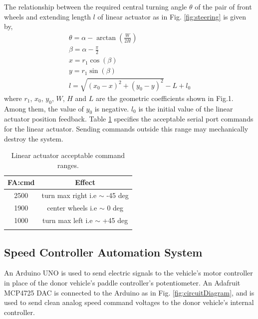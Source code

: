 \documentclass[a4paper]{article}
\begin{document}
	The relationship between the required central turning angle $\theta$ of the pair of front wheels and extending length $l$ of linear actuator as in Fig. \ref{fig:steering} is given by,    
	\begin{gather}
	\theta = \alpha - \arctan(\frac{W}{2H}) \\
	\beta = \alpha -\frac{\pi}{2}\\
	x = r_1 \cos(\beta) \\
	y = r_1 \sin(\beta) \\
	l = \sqrt{(x_0-x)^2 + (y_0-y)^2} - L + l_0    
	\end{gather}    
	where $r_1$, $x_0$, $y_0$, $W$, $H$ and $L$ are the geometric coefficients shown in Fig.1. Among them, the value of $y_0$ is negative. $l_0$ is the initial value of the linear actuator position feedback. Table \ref{tab:linear_actuator} specifies the acceptable serial port commands for the linear actuator. Sending commands outside this range may mechanically destroy the system.  
	\begin{table}
		\begin{center}
			\caption{Linear actuator acceptable command ranges.}
			\label{tab:linear_actuator}
			\begin{tabular}{ c c }
				\hline
				FA:cmd     &  Effect \\
				\hline
				2500    &    turn max right i.e $\sim$ -45 deg \\
				1900    &    center wheels i.e $\sim$ 0 deg \\ 
				1000    &    turn max left i.e $\sim$ +45 deg \\
				\hline\\
			\end{tabular}
		\end{center}   
	\end{table}
	
	
	\subsection{Speed Controller Automation System}
	
	An Arduino UNO \cite{oxer2011practical} is used to send electric signals to the vehicle's motor controller in place of the donor vehicle’s paddle controller’s potentiometer. An Adafruit MCP4725 DAC is connected to the Arduino as in Fig. \ref{fig:circuitDiagram}, and is used to send clean analog speed command voltages to the donor vehicle’s internal controller.
	
\end{document}
